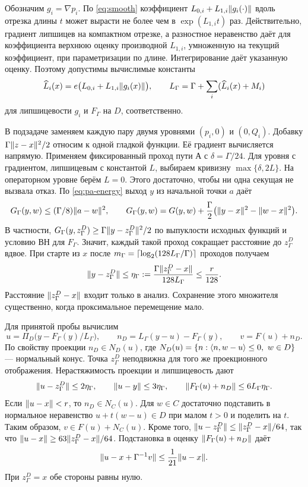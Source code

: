 Обозначим $g_i=\nabla p_i$. По \eqref{eq:smooth} коэффициент
$L_{0,i}+L_{1,i}\lVert g_i(\cdot)\rVert$ вдоль отрезка длины $t$
может вырасти не более чем в $\exp(L_{1,i}t)$ раз.
Действительно, градиент липшицев на компактном отрезке,
а разностное неравенство даёт для коэффициента верхнюю оценку
производной $L_{1,i}$, умноженную на текущий коэффициент, при
параметризации по длине. Интегрирование даёт указанную оценку.
Поэтому допустимы вычислимые константы
\[
 \widehat L_i(x)=e\bigl(L_{0,i}+L_{1,i}\lVert g_i(x)\rVert\bigr),\qquad
 L_\Gamma=\Gamma+\sum_i(\widehat L_i(x)+M_i)
\]
для липшицевости $g_i$ и $F_\Gamma$ на $D$, соответственно.

В подзадаче заменяем каждую пару двумя уровнями $(p_i,0)$ и $(0,Q_i)$.
Добавку $\Gamma\lVert z-x\rVert^2/2$ относим к одной гладкой функции.
Её градиент вычисляется напрямую. Применяем фиксированный проход
пути А с $\delta=\Gamma/24$. Для уровня с градиентом, липшицевым
с константой $L$, выбираем кривизну $\max\{\delta,2L\}$. На
операторном уровне берём $L=0$.
Этого достаточно, чтобы ни одна секущая не вызвала отказ.
По \eqref{eq:pa-energy} выход $y$ из начальной точки $a$ даёт
\[
 G_\Gamma(y,w)\le(\Gamma/8)\lVert a-w\rVert^2,\qquad
 G_\Gamma(y,w)=G(y,w)+\frac{\Gamma}{2}
                    \bigl(\lVert y-x\rVert^2-\lVert w-x\rVert^2\bigr).
\]
В частности, $G_\Gamma(y,z_\Gamma^D)\ge\Gamma\lVert y-z_\Gamma^D\rVert^2/2$
по выпуклости исходных функций и условию ВН для $F_\Gamma$.
Значит, каждый такой проход сокращает расстояние до $z_\Gamma^D$
вдвое. При старте из $x$ после
$m_\Gamma=\left\lceil \log_2(128L_\Gamma/\Gamma)\right\rceil$ проходов получаем
\begin{equation}\label{eq:hpe-inner}
 \lVert y-z_\Gamma^D\rVert
 \le \eta_\Gamma:=\frac{\Gamma \lVert z_\Gamma^D-x\rVert}{128L_\Gamma}
 \le \frac r{128}.
\end{equation}
Расстояние $\lVert z_\Gamma^D-x\rVert$ входит только в анализ.
Сохранение этого множителя существенно, когда проксимальное
перемещение мало.

Для принятой пробы вычислим
\[
 u=\Pi_D\bigl(y-F_\Gamma(y)/L_\Gamma\bigr),\qquad
 n_D=L_\Gamma(y-u)-F_\Gamma(y),\qquad
 v=F(u)+n_D .
\]
По свойству проекции $n_D\in N_D(u)$, где
$N_D(u)=\{n:\langle n,w-u\rangle\le0,\ w\in D\}$ --- нормальный конус.
Точка $z_\Gamma^D$ неподвижна для того же проекционного отображения.
Нерастяжимость проекции и липшицевость дают
\[
 \lVert u-z_\Gamma^D\rVert\le2\eta_\Gamma,\qquad
 \lVert u-y\rVert\le3\eta_\Gamma,\qquad
 \lVert F_\Gamma(u)+n_D\rVert\le6L_\Gamma\eta_\Gamma .
\]
Если $\lVert u-x\rVert<r$, то $n_D\in N_C(u)$. Для $w\in C$
достаточно подставить в нормальное неравенство
$u+t(w-u)\in D$ при малом $t>0$ и поделить на $t$.
Таким образом, $v\in F(u)+N_C(u)$.
Кроме того, $\lVert u-z_\Gamma^D\rVert\le\lVert z_\Gamma^D-x\rVert/64$,
так что $\lVert u-x\rVert\ge63\lVert z_\Gamma^D-x\rVert/64$.
Подстановка в оценку $\lVert F_\Gamma(u)+n_D\rVert$ даёт
\begin{equation}\label{eq:hpe-res}
 \lVert u-x+\Gamma^{-1}v\rVert\le \frac1{21}\lVert u-x\rVert.
\end{equation}
При $z_\Gamma^D=x$ обе стороны равны нулю.

